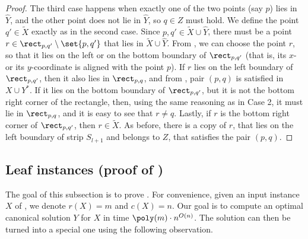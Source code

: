 \documentclass{toc}
\begin{document}
\begin{proof}
The third case happens when exactly one of the two points (say $p$) lies in $\hat Y$, and the other point does not lie in $\hat Y$, so $q\in Z$ must hold. We define  the point $q'\in \widetilde{X}$ exactly as in the second case. Since $p,q'\in \widetilde{X}\cup \hat Y$, there must be a point $r\in \rect_{p,q'}\setminus\set{p,q'}$ that lies in $\widetilde{X}\cup \hat Y$. From , we can choose the point $r$, so that it lies on the left or on the bottom boundary of $\rect_{p,q'}$ (that is, its $x$- or its $y$-coordinate is aligned with the point $p$). If $r$ lies on the left boundary of $\rect_{p,q'}$, then it also lies in $\rect_{p,q}$, and from , pair $(p,q)$ is satisfied in $X\cup Y^*$. If it lies on the bottom boundary of $\rect_{p,q'}$, but it is not the bottom right corner of the rectangle, then, using the same reasoning as in Case 2, it must lie in $\rect_{p,q}$, and it is easy to see that $r\neq q$. Lastly, if $r$ is the bottom right corner of $\rect_{p,q'}$, then $r\in \widetilde{X}$. As before, there is a copy of $r$, that lies on the left boundary of strip $S_{l+1}$ and belongs to $Z$, that satisfies the pair $(p,q)$. 
\end{proof}

\subsection{Leaf instances (proof of )}
\label{sec: leaf problem}


The goal of this subsection is to prove . For convenience, given an input instance $X$ of \minsat, we denote $r(X)=m$ and $c(X)=n$. Our goal is to compute an optimal canonical solution $Y$ for $X$ in time $\poly(m)\cdot n^{O(n)}$. The solution can then be turned into a special one using the following observation. 
\end{document}
